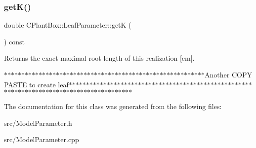 \subsubsection{\texorpdfstring{get\+K()}{getK()}}
{\footnotesize\ttfamily double C\+Plant\+Box\+::\+Leaf\+Parameter\+::getK (\begin{DoxyParamCaption}{ }\end{DoxyParamCaption}) const}



Returns the exact maximal root length of this realization \mbox{[}cm\mbox{]}. 

$\ast$$\ast$$\ast$$\ast$$\ast$$\ast$$\ast$$\ast$$\ast$$\ast$$\ast$$\ast$$\ast$$\ast$$\ast$$\ast$$\ast$$\ast$$\ast$$\ast$$\ast$$\ast$$\ast$$\ast$$\ast$$\ast$$\ast$$\ast$$\ast$$\ast$$\ast$$\ast$$\ast$$\ast$$\ast$$\ast$$\ast$$\ast$$\ast$$\ast$$\ast$$\ast$$\ast$$\ast$$\ast$$\ast$$\ast$$\ast$$\ast$$\ast$$\ast$$\ast$$\ast$$\ast$$\ast$$\ast$$\ast$$\ast$\+Another C\+O\+PY P\+A\+S\+TE to create leaf$\ast$$\ast$$\ast$$\ast$$\ast$$\ast$$\ast$$\ast$$\ast$$\ast$$\ast$$\ast$$\ast$$\ast$$\ast$$\ast$$\ast$$\ast$$\ast$$\ast$$\ast$$\ast$$\ast$$\ast$$\ast$$\ast$$\ast$$\ast$$\ast$$\ast$$\ast$$\ast$$\ast$$\ast$$\ast$$\ast$$\ast$$\ast$$\ast$$\ast$$\ast$$\ast$$\ast$$\ast$$\ast$$\ast$$\ast$$\ast$$\ast$$\ast$$\ast$$\ast$$\ast$$\ast$$\ast$$\ast$$\ast$$\ast$$\ast$$\ast$$\ast$$\ast$$\ast$$\ast$$\ast$$\ast$$\ast$$\ast$$\ast$$\ast$$\ast$$\ast$$\ast$$\ast$$\ast$$\ast$$\ast$$\ast$$\ast$$\ast$$\ast$$\ast$$\ast$$\ast$$\ast$$\ast$$\ast$$\ast$$\ast$$\ast$ 

The documentation for this class was generated from the following files\+:\begin{DoxyCompactItemize}
\item 
src/Model\+Parameter.\+h\item 
src/Model\+Parameter.\+cpp\end{DoxyCompactItemize}
